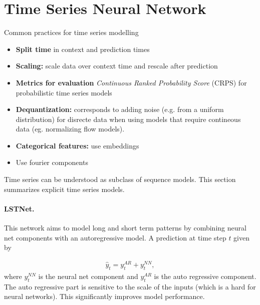 \documentclass[12pt,a4paper]{article}
\begin{document}
\section{Time Series Neural Network}
Common practices for time series modelling
\begin{itemize}
	\item \textbf{Split time} in context and prediction times
	\item \textbf{Scaling:} scale data over context time and rescale after prediction
	\item \textbf{Metrics for evaluation} \textit{Continuous Ranked Probability Score} (CRPS) for probabilistic time series models
	\item \textbf{Dequantization:} corresponds to adding noise (e.g. from a uniform distribution) for disrecte data when using models that require contineous data (eg. normalizing flow models).
	\item \textbf{Categorical features:} use embeddings 
	\item Use fourier components 
\end{itemize}
Time series can be understood as subclass of sequence models. This section summarizes explicit time series models.
\paragraph{LSTNet.} This network \cite{lstnet_2017} aims to model long and short term patterns by combining neural net components with an autoregressive model. A prediction at time step $t$ given by

\begin{align}
	\hat y_t = y_t^{AR} + y_t^{NN},
\end{align}
where $y_t^{NN}$ is the  neural net component and $y_t^{AR}$ is the auto regressive component. The auto regressive part is sensitive to the scale of the inputs (which is a hard for neural networks). This significantly improves model performance. 
\end{document}
